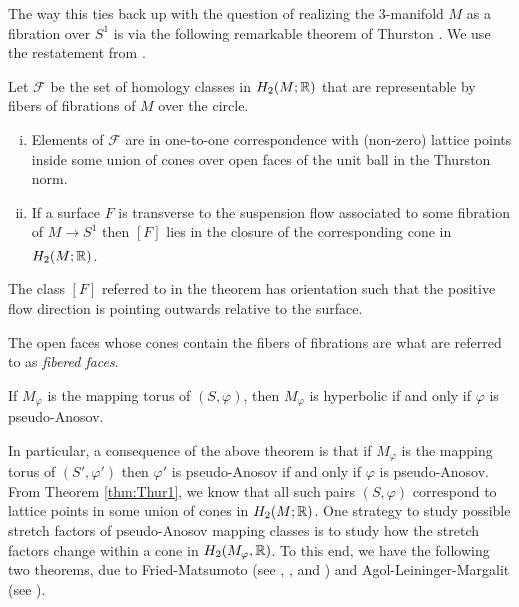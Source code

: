 The way this ties back up with the question of realizing the $3$-manifold $M$ as a fibration over
$S^1$ is via the following remarkable theorem of Thurston \cite{thurston1986norm}.  We use the restatement from \cite{yazdi2018pseudo}.

\begin{thm}[Thurston]
  \label{thm:Thur1}
  Let $\mathcal{F}$ be the set of homology classes in $H_2(M; \mathbb{R})$ that are representable by fibers of
  fibrations of $M$ over the circle.
\begin{enumerate}[(i)]
\item Elements of $\mathcal{F}$ are in one-to-one correspondence with (non-zero) lattice points
  inside some union of cones over open faces of the unit ball in the Thurston norm.
\item If a surface $F$ is transverse to the suspension flow associated to some fibration of
  $M \xrightarrow[]{} S^1$ then $[F]$ lies in the closure of the corresponding cone in $H_2(M;\mathbb{R})$.
\end{enumerate}
\end{thm}
The class $[F]$ referred to in the theorem has orientation such that the positive flow direction is pointing outwards relative to the surface.

The open faces whose cones contain the fibers of fibrations are what are referred to as
\emph{fibered faces}.  %

\begin{thm}
    \label{thm:ThurHyp}
  If $M_\varphi$ is the mapping torus of $(S, \varphi)$, then $M_\varphi$ is hyperbolic if and only if $\varphi$ is pseudo-Anosov.
\end{thm}

In particular, a consequence of the above theorem is that if $M_\varphi$ is the mapping torus of $(S', \varphi')$ then $\varphi'$ is pseudo-Anosov if and only if $\varphi$ is pseudo-Anosov. From Theorem \ref{thm:Thur1}, we know that all such pairs $(S, \varphi)$ correspond to lattice points in some union of
cones in $H_2(M;\mathbb{R})$. One strategy to study possible stretch factors of pseudo-Anosov mapping classes is to study how the stretch factors change within a cone in $H_2(M_\varphi,\mathbb{R})$. To this end, we have the following two
theorems, due to Fried-Matsumoto (see \cite{fried1982flow}, \cite{fried1983transitive}, and
\cite{matsumoto1987topological}) and Agol-Leininger-Margalit (see \cite{agol6983pseudo}).

